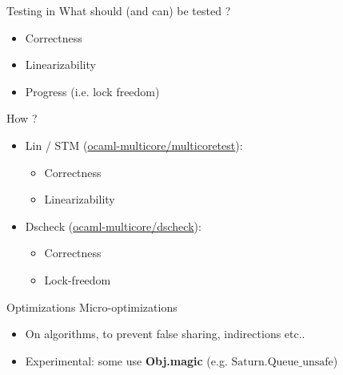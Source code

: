  \begin{frame}{Testing in \Saturn}
    What should (and can) be tested ?
    \begin{itemize}[label=$\bullet$]
     \item Correctness 
     \item Linearizability
     \item Progress (i.e. lock freedom) 
    \end{itemize}
    How ?
    \begin{itemize}[label=$\bullet$]
     \item Lin / STM (\href{https://github.com/ocaml-multicore/multicoretests}{ocaml-multicore/multicoretest}):
        \begin{itemize}[label=$\diamond$]
            \item Correctness
            \item Linearizability
        \end{itemize}
     \item Dscheck (\href{https://github.com/ocaml-multicore/dscheck}{ocaml-multicore/dscheck}):
     \begin{itemize}[label=$\diamond$]
        \item Correctness
        \item Lock-freedom
        \end{itemize}
    \end{itemize}
 
  \end{frame}



\begin{frame}{Optimizations}
    Micro-optimizations
    \begin{itemize}[label=$\diamond$]
        \item On algorithms, to prevent false sharing, indirections etc..
        \item Experimental: some use \textbf{Obj.magic} (e.g. $\text{Saturn.Queue\_unsafe}$)
    \end{itemize}
\end{frame}

